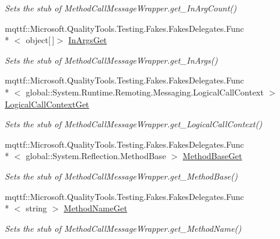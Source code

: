 \begin{DoxyCompactItemize}
\begin{DoxyCompactList}\small\item\em Sets the stub of Method\-Call\-Message\-Wrapper.\-get\-\_\-\-In\-Arg\-Count()\end{DoxyCompactList}\item 
mqttf\-::\-Microsoft.\-Quality\-Tools.\-Testing.\-Fakes.\-Fakes\-Delegates.\-Func\\*
$<$ object\mbox{[}$\,$\mbox{]}$>$ \hyperlink{class_system_1_1_runtime_1_1_remoting_1_1_messaging_1_1_fakes_1_1_stub_method_call_message_wrapper_aa873377063f6c926edc30e2556d0ad31}{In\-Args\-Get}
\begin{DoxyCompactList}\small\item\em Sets the stub of Method\-Call\-Message\-Wrapper.\-get\-\_\-\-In\-Args()\end{DoxyCompactList}\item 
mqttf\-::\-Microsoft.\-Quality\-Tools.\-Testing.\-Fakes.\-Fakes\-Delegates.\-Func\\*
$<$ global\-::\-System.\-Runtime.\-Remoting.\-Messaging.\-Logical\-Call\-Context $>$ \hyperlink{class_system_1_1_runtime_1_1_remoting_1_1_messaging_1_1_fakes_1_1_stub_method_call_message_wrapper_accd09925f14f42f9c477e688cdb212b8}{Logical\-Call\-Context\-Get}
\begin{DoxyCompactList}\small\item\em Sets the stub of Method\-Call\-Message\-Wrapper.\-get\-\_\-\-Logical\-Call\-Context()\end{DoxyCompactList}\item 
mqttf\-::\-Microsoft.\-Quality\-Tools.\-Testing.\-Fakes.\-Fakes\-Delegates.\-Func\\*
$<$ global\-::\-System.\-Reflection.\-Method\-Base $>$ \hyperlink{class_system_1_1_runtime_1_1_remoting_1_1_messaging_1_1_fakes_1_1_stub_method_call_message_wrapper_ab135c9d1a65c5d9274ed114bb614c0ab}{Method\-Base\-Get}
\begin{DoxyCompactList}\small\item\em Sets the stub of Method\-Call\-Message\-Wrapper.\-get\-\_\-\-Method\-Base()\end{DoxyCompactList}\item 
mqttf\-::\-Microsoft.\-Quality\-Tools.\-Testing.\-Fakes.\-Fakes\-Delegates.\-Func\\*
$<$ string $>$ \hyperlink{class_system_1_1_runtime_1_1_remoting_1_1_messaging_1_1_fakes_1_1_stub_method_call_message_wrapper_acc9d8c974ac45514b18927ba10317d5c}{Method\-Name\-Get}
\begin{DoxyCompactList}\small\item\em Sets the stub of Method\-Call\-Message\-Wrapper.\-get\-\_\-\-Method\-Name()\end{DoxyCompactList}\item 

\end{DoxyCompactItemize}
